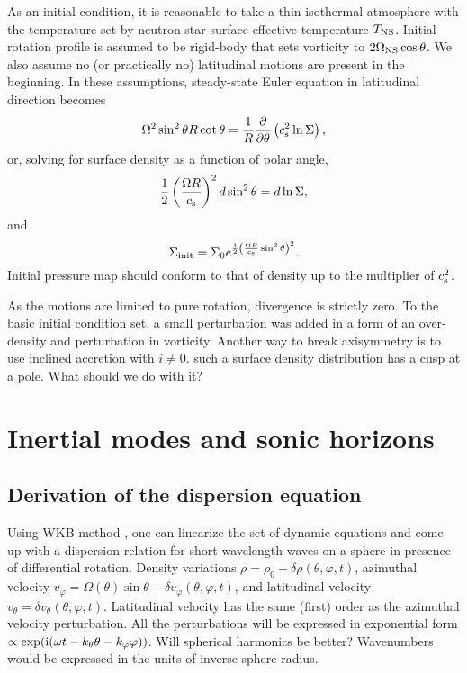 \documentclass[usenatbib,onecolumn]{mnras}
\newcommand{\alert}[1]{\color{red} #1\color{black}}
\newcommand{\ppardir}[2]{\ensuremath{\frac{\partial }{\partial #1} \left( #2\right)}}
\newcommand{\cs}{\ensuremath{c_{\rm s}}}
\renewcommand{\i}{\ensuremath{{\rm i}}}
\begin{document}
As an initial condition, it is reasonable to take a thin isothermal
atmosphere with the temperature set by neutron star surface effective temperature
$T_{\rm NS}$. Initial rotation profile is assumed to be rigid-body that sets vorticity
to $2\Omega_{\rm NS}\cos \theta$. We also assume no (or practically no)
latitudinal motions are present in the beginning.
In these assumptions, steady-state Euler equation in
latitudinal direction becomes
\begin{equation}\label{E:IC:Euler}
\Omega^2 \sin^2\theta R \cot \theta = \frac{1}{R} \ppardir{\theta}{\cs^2 \ln\Sigma},
\end{equation}
or, solving for surface density as a function of polar angle,
\begin{equation}
\displaystyle \frac{1}{2}\left( \frac{\Omega R}{\cs}\right)^2 d \sin^2\theta = d\ln \Sigma ,
\end{equation}
and
\begin{equation}\label{E:IC:Sigma}
\displaystyle \Sigma_{\rm init} = \Sigma_0 e^{\frac{1}{2}\left(\frac{\Omega R }{ \cs}\sin^2\theta\right)^2}.
\end{equation}
Initial pressure map should conform to that of density up to the multiplier of
$\cs^2$.

As the motions are limited to pure rotation, divergence is strictly zero. To
the basic initial condition set, a small perturbation was added in a form of
an over-density and perturbation in vorticity. Another way to break
axisymmetry is to use inclined accretion with $i\neq 0$. \alert{such a surface
density distribution has a cusp at a pole. What should we do with it?}

\section{Inertial modes and sonic horizons}

\subsection{Derivation of the dispersion equation}

Using WKB method \citep{WKB}, one can linearize the set of dynamic equations
and come up with a dispersion relation for short-wavelength waves on a sphere
in presence of differential rotation. Density variations $\rho = \rho_0
+\delta \rho(\theta,\varphi, t)$, azimuthal velocity $v_\varphi = \Omega(\theta) \sin\theta +
\delta v_\varphi(\theta,\varphi, t)$, and latitudinal velocity $v_\theta = \delta
v_\theta(\theta,\varphi, t)$. Latitudinal velocity has the same (first) order
as the azimuthal velocity perturbation. All the perturbations will be
expressed in exponential form $\propto \exp(\i(\omega t - k_\theta \theta
- k_\varphi \varphi))$. \alert{Will spherical harmonics be better?}
Wavenumbers would be expressed in the units of inverse sphere radius. 
\end{document}
